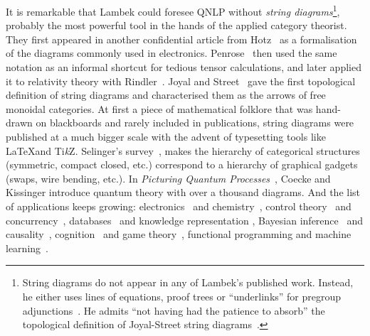 It is remarkable that Lambek could foresee QNLP without \emph{string diagrams}\footnote
{String diagrams do not appear in any of Lambek's published work.
Instead, he either uses lines of equations, proof trees or ``underlinks'' for pregroup adjunctions~\cite{Lambek08}.
He admits ``not having had the patience to absorb'' the topological definition of Joyal-Street string diagrams~\cite{Lambek10}.
}, probably the most powerful tool in the hands of the applied category theorist.
They first appeared in another confidential article from Hotz~\cite{Hotz65} as a formalisation of the diagrams commonly used in electronics.
Penrose~\cite{Penrose71} then used the same notation as an informal shortcut for tedious tensor calculations, and later applied it to relativity theory with Rindler~\cite{PenroseRindler84}.
Joyal and Street~\cite{JoyalStreet88,JoyalStreet91,JoyalStreet95} gave the first topological definition of string diagrams and characterised them as the arrows of free monoidal categories.
At first a piece of mathematical folklore that was hand-drawn on blackboards and rarely included in publications, string diagrams were published at a much bigger scale with the advent of typesetting tools like \LaTeX and Ti\emph{k}Z.
Selinger's survey~\cite{Selinger10}, makes the hierarchy of categorical structures (symmetric, compact closed, etc.) correspond to a hierarchy of graphical gadgets (swaps, wire bending, etc.).
In \emph{Picturing Quantum Processes}~\cite{CoeckeKissinger17}, Coecke and Kissinger introduce quantum theory with over a thousand diagrams.
And the list of applications keeps growing:
electronics~\cite{BaezFong15} and chemistry~\cite{BaezPollard17},
control theory~\cite{BaezErbele14} and concurrency~\cite{BonchiEtAl14a},
databases~\cite{BonchiEtAl18} and knowledge representation \cite{Patterson17},
Bayesian inference~\cite{CoeckeSpekkens12,ChoJacobs19} and causality~\cite{KissingerUijlen19},
cognition~\cite{BoltEtAl17} and game theory~\cite{GhaniEtAl18},
functional programming \cite{Riley18} and machine learning~\cite{FongEtAl17}.

